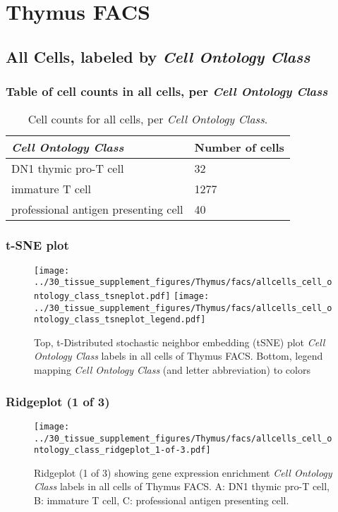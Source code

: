\clearpage
\section{Thymus FACS}

\subsection{All Cells, labeled by \emph{Cell Ontology Class}}
\subsubsection{Table of cell counts in all cells, per \emph{Cell Ontology Class}}\begin{table}[h]
\centering
\label{my-label}
\begin{tabular}{@{}ll@{}}
\toprule

\emph{Cell Ontology Class}& Number of cells \\ \midrule
DN1 thymic pro-T cell & 32 \\

immature T cell & 1277 \\

professional antigen presenting cell & 40 \\
\bottomrule
\end{tabular}
\caption{Cell counts for all cells, per \emph{Cell Ontology Class}.}
\end{table}

\clearpage
\subsubsection{t-SNE plot}
\begin{figure}[h]
\centering
\texttt{[image: ../30\_tissue\_supplement\_figures/Thymus/facs/allcells\_cell\_ontology\_class\_tsneplot.pdf]}
\texttt{[image: ../30\_tissue\_supplement\_figures/Thymus/facs/allcells\_cell\_ontology\_class\_tsneplot\_legend.pdf]}
\caption{Top, t-Distributed stochastic neighbor embedding (tSNE) plot  \emph{Cell Ontology Class} labels in all cells of Thymus FACS. Bottom, legend mapping \emph{Cell Ontology Class} (and letter abbreviation) to colors}
\end{figure}


\clearpage

\subsubsection{Ridgeplot (1 of 3)}
\begin{figure}[h]
\centering
\texttt{[image: ../30\_tissue\_supplement\_figures/Thymus/facs/allcells\_cell\_ontology\_class\_ridgeplot\_1-of-3.pdf]}

\caption{ Ridgeplot (1 of 3)  showing gene expression enrichment \emph{Cell Ontology Class} labels in all cells of Thymus FACS. A: DN1 thymic pro-T cell, B: immature T cell, C: professional antigen presenting cell.}
\end{figure}


